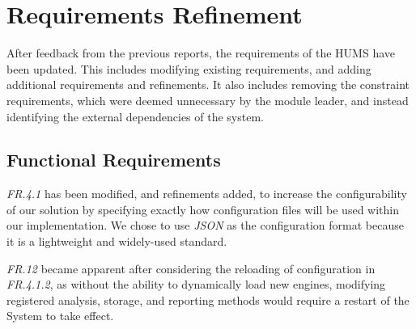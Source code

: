 \documentclass[10pt,a4paper]{article}
\begin{document}
\section{Requirements Refinement}
\label{sec:requirements}
After feedback from the previous reports, the requirements of the HUMS have been updated. This includes modifying existing requirements, and adding additional requirements and refinements. It also includes removing the constraint requirements, which were deemed unnecessary by the module leader, and instead identifying the external dependencies of the system.

\subsection{Functional Requirements}
\label{sec:functional_requirements}

\emph{FR.4.1} has been modified, and refinements added, to increase the configurability of our solution by specifying exactly how configuration files will be used within our implementation. We chose to use \emph{JSON} as the configuration format because it is a lightweight and widely-used standard.

\emph{FR.12} became apparent after considering the reloading of configuration in \emph{FR.4.1.2}, as without the ability to dynamically load new engines, modifying registered analysis, storage, and reporting methods would require a restart of the System to take effect.
\end{document}
